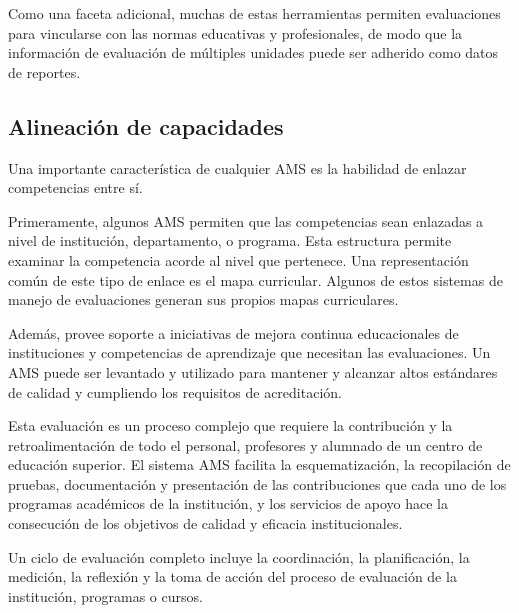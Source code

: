Como una faceta adicional, muchas de estas herramientas permiten evaluaciones para vincularse con las normas educativas y profesionales, de modo que la información de evaluación de múltiples unidades puede ser adherido como datos de reportes.

\subsection{Alineación de capacidades}
Una importante característica de cualquier AMS es la habilidad de enlazar competencias entre sí.

Primeramente, algunos AMS permiten que las competencias sean enlazadas a nivel de institución, departamento, o programa. Esta estructura permite examinar la competencia acorde al nivel que pertenece. Una representación común de este tipo de enlace es el mapa curricular. Algunos de estos sistemas de manejo de evaluaciones generan sus propios mapas curriculares.

Además, provee soporte a iniciativas de mejora continua educacionales de instituciones y competencias de aprendizaje que necesitan las evaluaciones. Un AMS puede ser levantado y utilizado para mantener y alcanzar altos estándares de calidad y cumpliendo los requisitos de acreditación\citep{kuh_using_2015}.

Esta evaluación es un proceso complejo que requiere la contribución y la retroalimentación de todo el personal, profesores y alumnado de un centro de educación superior. El sistema AMS facilita la esquematización, la recopilación de pruebas, documentación y presentación de las contribuciones que cada uno de los programas académicos de la institución, y los servicios de apoyo hace la consecución de los objetivos de calidad y eficacia institucionales.

Un ciclo de evaluación completo incluye la coordinación, la planificación, la medición, la reflexión y la toma de acción del proceso de evaluación de la institución, programas o cursos.